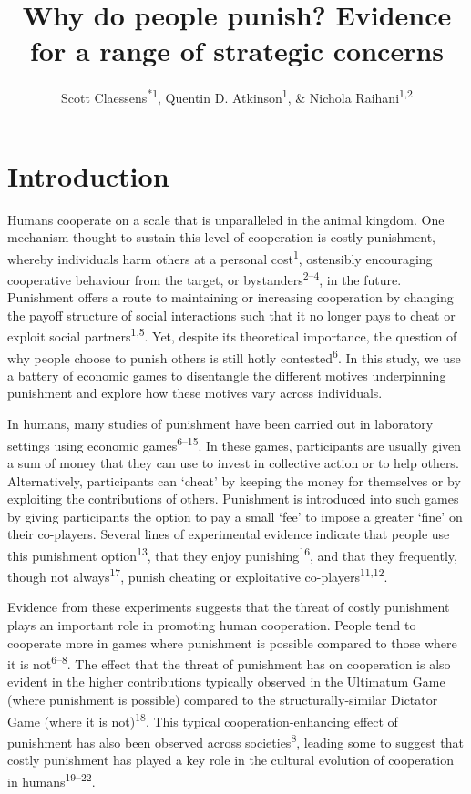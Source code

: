 \documentclass[
  english,
  man, donotrepeattitle,floatsintext]{apa6}
\title{Why do people punish? Evidence for a range of strategic concerns}
\author{Scott Claessens\textsuperscript{*1}, Quentin D. Atkinson\textsuperscript{1}, \& Nichola Raihani\textsuperscript{1,2}}
\date{}
\affiliation{\vspace{0.5cm}\textsuperscript{1} \footnotesize School of Psychology, University of Auckland, Auckland, New Zealand\\\textsuperscript{2} \footnotesize Department of Experimental Psychology, University College London, London, United Kingdom}
\begin{document}
\maketitle

\linenumbers

\hypertarget{introduction}{%
\section{Introduction}\label{introduction}}

Humans cooperate on a scale that is unparalleled in the animal kingdom. One
mechanism thought to sustain this level of cooperation is costly punishment,
whereby individuals harm others at a personal cost\textsuperscript{1},
ostensibly encouraging cooperative behaviour from the target, or bystanders\textsuperscript{2--4}, in the future. Punishment offers a
route to maintaining or increasing cooperation by changing the payoff structure
of social interactions such that it no longer pays to cheat or exploit social
partners\textsuperscript{1,5}. Yet, despite its theoretical
importance, the question of why people choose to punish others is still hotly
contested\textsuperscript{6}. In this study, we use a battery of economic games to
disentangle the different motives underpinning punishment and explore how these
motives vary across individuals.

In humans, many studies of punishment have been carried out in laboratory
settings using economic games\textsuperscript{6--15}. In these games, participants are usually given a sum of money
that they can use to invest in collective action or to help others.
Alternatively, participants can `cheat' by keeping the money for themselves or
by exploiting the contributions of others. Punishment is introduced into such
games by giving participants the option to pay a small `fee' to impose a greater
`fine' on their co-players. Several lines of experimental evidence indicate that
people use this punishment option\textsuperscript{13}, that they enjoy
punishing\textsuperscript{16}, and that they frequently, though not
always\textsuperscript{17}, punish cheating or exploitative
co-players\textsuperscript{11,12}.

Evidence from these experiments suggests that the threat of costly punishment
plays an important role in promoting human cooperation. People tend to cooperate
more in games where punishment is possible compared to those where it is not\textsuperscript{6--8}. The effect that the threat of
punishment has on cooperation is also evident in the higher contributions
typically observed in the Ultimatum Game (where punishment is possible) compared
to the structurally-similar Dictator Game (where it is not)\textsuperscript{18}. This
typical cooperation-enhancing effect of punishment has also been observed across
societies\textsuperscript{8}, leading some to suggest that costly punishment has
played a key role in the cultural evolution of cooperation in humans\textsuperscript{19--22}.
\end{document}
